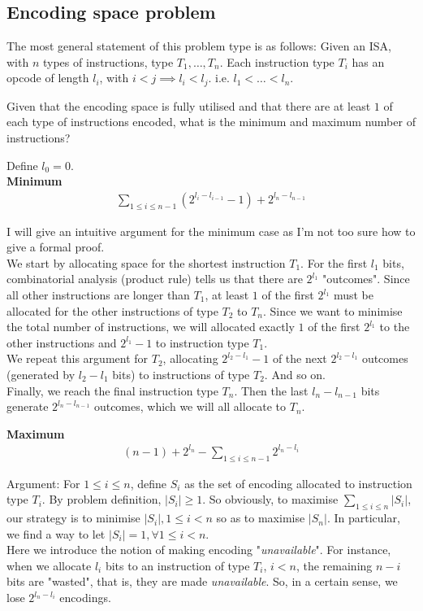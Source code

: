 \documentclass{article}
\begin{document}
\subsection{Encoding space problem}
The most general statement of this problem type is as follows: Given an ISA, with $n$ types of instructions, type $T_1, \dots, T_n$. Each instruction type $T_i$ has an opcode of length $l_i$, with $i < j\implies l_i < l_j$. i.e. $l_1 < \dots < l_n$.

Given that the encoding space is fully utilised and that there are at least $1$ of each type of instructions encoded, what is the minimum and maximum number of instructions?

Define $l_0=0$.\\
\textbf{Minimum} 
\begin{align*}
	\sum_{1\leq i\leq n-1}(2^{l_i-l_{i-1}}-1) + 2^{l_n-l_{n-1}}
\end{align*}

I will give an intuitive argument for the minimum case as I'm not too sure how to give a formal proof.\\
We start by allocating space for the shortest instruction $T_1$. For the first $l_1$ bits, combinatorial analysis (product rule) tells us that there are $2^{l_1}$ "outcomes". Since all other instructions are longer than $T_1$, at least $1$ of the first $2^{l_1}$ must be allocated for the other instructions of type $T_2$ to $T_n$. Since we want to minimise the total number of instructions, we will allocated exactly $1$ of the first $2^{l_1}$ to the other instructions and $2^{l_1}-1$ to instruction type $T_1$.\\
We repeat this argument for $T_2$, allocating $2^{l_2-l_1}-1$ of the next $2^{l_2-l_1}$ outcomes (generated by $l_2-l_1$ bits) to instructions of type $T_2$. And so on.\\
Finally, we reach the final instruction type $T_n$. Then the last $l_n-l_{n-1}$ bits generate  $2^{l_n-l_{n-1}}$ outcomes, which we will all allocate to $T_n$.

\textbf{Maximum}
\begin{align*}
	(n-1) + 2^{l_n} - \sum_{1\leq i\leq n-1}2^{l_n-l_i}
\end{align*}

Argument: For $1\leq i\leq n$, define $S_i$ as the set of encoding allocated to instruction type $T_i$. By problem definition, $|S_i|\geq 1$. So obviously, to maximise $\sum_{1\leq i\leq n} |S_i|$, our strategy is to minimise $|S_i|, 1\leq i<n$ so as to maximise $|S_n|$. In particular, we find a way to let $|S_i|=1, \forall 1\leq i<n$.\\
Here we introduce the notion of making encoding "\textit{unavailable}". For instance, when we allocate $l_i$ bits to an instruction of type $T_i$, $i<n$, the remaining $n-i$ bits are "wasted", that is, they are made \textit{unavailable}. So, in a certain sense, we lose $2^{l_n-l_i}$ encodings.
\end{document}
